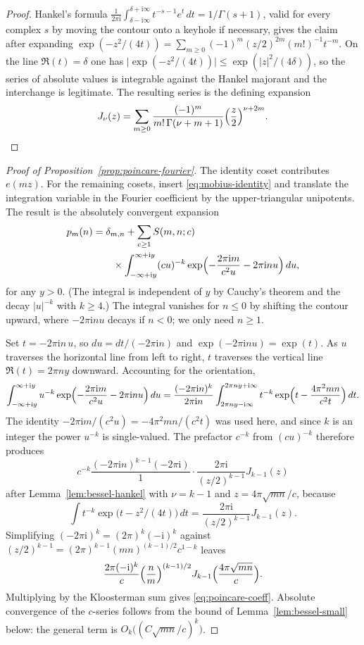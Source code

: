 \documentclass[11pt]{amsart}
\theoremstyle{definition}
\theoremstyle{remark}
\numberwithin{equation}{section}
\newcommand{\ii}{\mathrm{i}}
\begin{document}
\begin{proof}
Hankel's formula $\frac{1}{2\pi\ii}\int_{\delta-\ii\infty}^{\delta+\ii\infty}t^{-s-1}e^{t}\,dt=1/\Gamma(s+1)$, valid for every complex $s$ by moving the contour onto a keyhole if necessary, gives the claim after expanding $\exp(-z^2/(4t))=\sum_{m\ge 0}(-1)^m(z/2)^{2m}(m!)^{-1}t^{-m}$. On the line $\Re(t)=\delta$ one has $\lvert\exp(-z^2/(4t))\rvert\le\exp(\lvert z\rvert^2/(4\delta))$, so the series of absolute values is integrable against the Hankel majorant and the interchange is legitimate. The resulting series is the defining expansion
\[
J_\nu(z)=\sum_{m\ge 0}\frac{(-1)^m}{m!\,\Gamma(\nu+m+1)}\Bigl(\frac z2\Bigr)^{\nu+2m}.
\]
\end{proof}

\begin{proof}[Proof of Proposition~\ref{prop:poincare-fourier}]
The identity coset contributes $e(mz)$. For the remaining cosets, insert \eqref{eq:mobius-identity} and translate the integration variable in the Fourier coefficient by the upper-triangular unipotents. The result is the absolutely convergent expansion
\begin{equation}\label{eq:fourier-integral}
\begin{aligned}
p_m(n)
&=\delta_{m,n}
+\sum_{c\ge 1}S(m,n;c)\\
&\qquad\times\int_{-\infty+\ii y}^{\infty+\ii y}
(cu)^{-k}\exp\Bigl(-\frac{2\pi\ii m}{c^2 u}-2\pi\ii n u\Bigr)\,du,
\end{aligned}
\end{equation}
for any $y>0$. (The integral is independent of $y$ by Cauchy's theorem and the decay $\lvert u\rvert^{-k}$ with $k\ge 4$.) The integral vanishes for $n\le 0$ by shifting the contour upward, where $-2\pi\ii n u$ decays if $n<0$; we only need $n\ge 1$.

Set $t=-2\pi\ii n\, u$, so $du=dt/(-2\pi\ii n)$ and $\exp(-2\pi\ii n u)=\exp(t)$. As $u$ traverses the horizontal line from left to right, $t$ traverses the vertical line $\Re(t)=2\pi n y$ downward. Accounting for the orientation,
\[
\int_{-\infty+\ii y}^{\infty+\ii y}
u^{-k}\exp\Bigl(-\frac{2\pi\ii m}{c^2 u}-2\pi\ii n u\Bigr)\,du
=\frac{(-2\pi\ii n)^{k}}{2\pi\ii n}
\int_{2\pi ny-\ii\infty}^{2\pi ny+\ii\infty}
t^{-k}\exp\Bigl(t-\frac{4\pi^2 mn}{c^2 t}\Bigr)\,dt.
\]
The identity $-2\pi\ii m/(c^2 u)=-4\pi^2 mn/(c^2 t)$ was used here, and since $k$ is an integer the power $u^{-k}$ is single-valued. The prefactor $c^{-k}$ from $(cu)^{-k}$ therefore produces
\[
c^{-k}\frac{(-2\pi\ii n)^{k-1}(-2\pi\ii)}{1}
\cdot
\frac{2\pi\ii}{(z/2)^{k-1}}J_{k-1}(z)
\]
after Lemma~\ref{lem:bessel-hankel} with $\nu=k-1$ and $z=4\pi\sqrt{mn}/c$, because
\[
\int t^{-k}\exp\bigl(t-z^2/(4t)\bigr)\,dt
=\frac{2\pi\ii}{(z/2)^{k-1}}J_{k-1}(z).
\]
Simplifying $(-2\pi\ii)^k= (2\pi)^k(-\ii)^k$ against $(z/2)^{k-1}=(2\pi)^{k-1}(mn)^{(k-1)/2}c^{1-k}$ leaves
\[
\frac{2\pi(-\ii)^k}{c}\Bigl(\frac nm\Bigr)^{(k-1)/2}J_{k-1}\Bigl(\frac{4\pi\sqrt{mn}}{c}\Bigr).
\]
Multiplying by the Kloosterman sum gives \eqref{eq:poincare-coeff}. Absolute convergence of the $c$-series follows from the bound of Lemma~\ref{lem:bessel-small} below: the general term is $O_k\bigl((C\sqrt{mn}/c)^{k}\bigr)$.
\end{proof}
\end{document}

